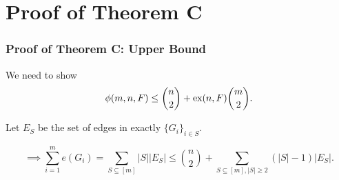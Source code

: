 \documentclass{beamer}
\newcommand*{\ex}{\textnormal{ex}}
\begin{document}














\section{Proof of Theorem C}

\begin{frame}
  \frametitle{Proof of Theorem C: Upper Bound}

  We need to show
  \[  
    \phi(m, n ,F) \leq \binom{n}{2} + \ex(n, F)\binom{m}{2}.  
  \]

  \pause
  
  Let $E_S$ be the set of edges in exactly $\{G_i\}_{i \in S}$.

  \pause

  \[
    \implies \sum_{i = 1}^m e(G_i) = \sum_{S \subseteq [m]} |S||E_S| \leq \binom{n}{2} + \sum_{S \subseteq [m], |S| \geq 2} (|S| - 1)|E_S|.
  \]
\end{frame}
\end{document}
